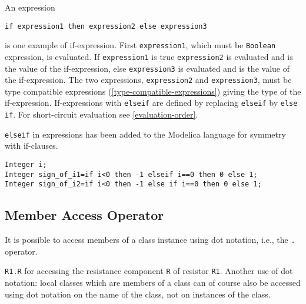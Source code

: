 An expression
\begin{lstlisting}[language=modelica]
if expression1 then expression2 else expression3
\end{lstlisting}
is one example of if-expression. First \lstinline!expression1!, which must be \lstinline!Boolean! expression, is evaluated.
If \lstinline!expression1! is true \lstinline!expression2! is evaluated and is the value of the if-expression, else \lstinline!expression3! is evaluated and is the value of the if-expression.
The two expressions, \lstinline!expression2! and \lstinline!expression3!, must be type compatible expressions (\cref{type-compatible-expressions}) giving the type of the if-expression.
If-expressions with \lstinline!elseif! are defined by replacing \lstinline!elseif! by \lstinline!else if!.
For short-circuit evaluation see \cref{evaluation-order}.

\begin{nonnormative}
\lstinline!elseif! in expressions has been added to the Modelica language for symmetry with if-clauses.
\end{nonnormative}

\begin{example}
\begin{lstlisting}[language=modelica]
Integer i;
Integer sign_of_i1=if i<0 then -1 elseif i==0 then 0 else 1;
Integer sign_of_i2=if i<0 then -1 else if i==0 then 0 else 1;
\end{lstlisting}
\end{example}

\subsection{Member Access Operator}\label{member-access-operator}

It is possible to access members of a class instance using dot notation,
i.e., the \lstinline!.! operator.

\begin{example}
\lstinline!R1.R! for accessing the resistance component \lstinline!R!
of resistor \lstinline!R1!. Another use of dot notation: local classes
which are members of a class can of course also be accessed using dot
notation on the name of the class, not on instances of the class.
\end{example}

